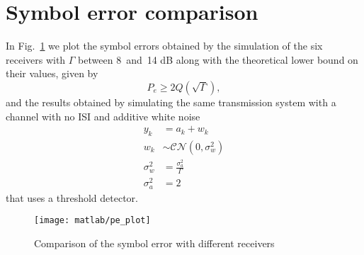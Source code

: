 \documentclass[a4paper,oneside]{article}
\newcommand{\distr}[0]{\sim}
\begin{document}
\section{Symbol error comparison}
In Fig.~\ref{plot:pe_all} we plot the symbol errors obtained by the
simulation of the six receivers with $\Gamma$ between 8~and~14 dB
along with the theoretical lower bound on their values, given by
\begin{equation}
  P_e \geq 2 Q \left(\sqrt{\Gamma}\right) ,
\end{equation}
and the results obtained by simulating the same transmission system
with a channel with no ISI and additive white noise
\begin{align}
  y_k &= a_k + w_k \\
  w_k & \distr \mathcal{CN}(0, \sigma^2_w) \\
  \sigma^2_w &= \frac{\sigma^2_a}{\Gamma} \\
  \sigma^2_a &= 2 
\end{align}
that uses a threshold detector.

\begin{figure}[htbp]
  \centering
  \texttt{[image: matlab/pe\_plot]}
  \caption{Comparison of the symbol error with different receivers}
  \label{plot:pe_all}
\end{figure}
\end{document}
